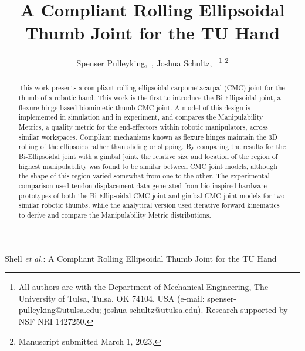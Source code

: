 \documentclass[journal]{IEEEtran}
\begin{document}
\title{A Compliant Rolling Ellipsoidal Thumb Joint for the TU Hand}

\author{Spenser Pulleyking,~, Joshua Schultz,~
\thanks{All authors are with the Department of Mechanical Engineering, The University of Tulsa, Tulsa, OK 74104, USA (e-mail: spenser-pulleyking@utulsa.edu; joshua-schultz@utulsa.edu). Research supported by NSF NRI 1427250.}%
\thanks{Manuscript submitted March 1, 2023.}}



%
{Shell \MakeLowercase{\textit{et al.}}: A Compliant Rolling Ellipsoidal Thumb Joint for the TU Hand}


\maketitle

\begin{abstract}
This work presents a compliant rolling ellipsoidal carpometacarpal (CMC) joint for the thumb of a robotic hand. This work is the first to introduce the Bi-Ellipsoidal joint, a flexure hinge-based biomimetic thumb CMC joint. A model of this design is implemented in simulation and in experiment, and compares the Manipulability Metrics, a quality metric for the end-effectors within robotic manipulators, across similar workspaces. Compliant mechanisms known as flexure hinges maintain the 3D rolling of the ellipsoids rather than sliding or slipping. By comparing the results for the Bi-Ellipsoidal joint with a gimbal joint, the relative size and location of the region of highest manipulability was found to be similar between CMC joint models, although the shape of this region varied somewhat from one to the other. The experimental comparison used tendon-displacement data generated from bio-inspired hardware prototypes of both the Bi-Ellipsoidal CMC joint and gimbal CMC joint models for two similar robotic thumbs, while the analytical version used iterative forward kinematics to derive and compare the Manipulability Metric distributions. 
\end{abstract}
\end{document}
